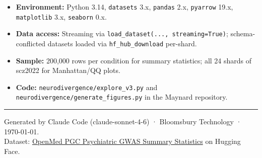 \documentclass[11pt, a4paper]{article}
\begin{document}
\begin{itemize}
  \item \textbf{Environment:} Python 3.14, \texttt{datasets} 3.x, \texttt{pandas} 2.x,
        \texttt{pyarrow} 19.x, \texttt{matplotlib} 3.x, \texttt{seaborn} 0.x.
  \item \textbf{Data access:} Streaming via \texttt{load\_dataset(..., streaming=True)};
        schema-conflicted datasets loaded via \texttt{hf\_hub\_download} per-shard.
  \item \textbf{Sample:} 200,000 rows per condition for summary statistics;
        all 24 shards of scz2022 for Manhattan/QQ plots.
  \item \textbf{Code:} \texttt{neurodivergence/explore\_v3.py} and
        \texttt{neurodivergence/generate\_figures.py} in the Maynard repository.
\end{itemize}

\vspace{12pt}
\hrule
\vspace{6pt}
{\small\color{muted}
Generated by Claude Code (claude-sonnet-4-6) · Bloomsbury Technology · \today. \\
Dataset: \href{https://huggingface.co/collections/OpenMed/pgc-psychiatric-gwas-summary-statistics}{OpenMed PGC Psychiatric GWAS Summary Statistics} on Hugging Face.
}
\end{document}
